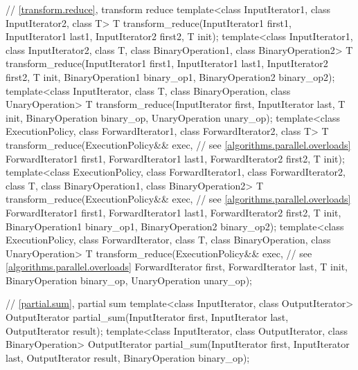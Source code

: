 \begin{codeblock}
{  // \ref{transform.reduce}, transform reduce
  template<class InputIterator1, class InputIterator2, class T>
    T transform_reduce(InputIterator1 first1, InputIterator1 last1,
                       InputIterator2 first2,
                       T init);
  template<class InputIterator1, class InputIterator2, class T,
           class BinaryOperation1, class BinaryOperation2>
    T transform_reduce(InputIterator1 first1, InputIterator1 last1,
                       InputIterator2 first2,
                       T init,
                       BinaryOperation1 binary_op1,
                       BinaryOperation2 binary_op2);
  template<class InputIterator, class T,
           class BinaryOperation, class UnaryOperation>
    T transform_reduce(InputIterator first, InputIterator last,
                       T init,
                       BinaryOperation binary_op, UnaryOperation unary_op);
  template<class ExecutionPolicy,
           class ForwardIterator1, class ForwardIterator2, class T>
    T transform_reduce(ExecutionPolicy&& exec, // see \ref{algorithms.parallel.overloads}
                       ForwardIterator1 first1, ForwardIterator1 last1,
                       ForwardIterator2 first2,
                       T init);
  template<class ExecutionPolicy,
           class ForwardIterator1, class ForwardIterator2, class T,
           class BinaryOperation1, class BinaryOperation2>
    T transform_reduce(ExecutionPolicy&& exec, // see \ref{algorithms.parallel.overloads}
                       ForwardIterator1 first1, ForwardIterator1 last1,
                       ForwardIterator2 first2,
                       T init,
                       BinaryOperation1 binary_op1,
                       BinaryOperation2 binary_op2);
  template<class ExecutionPolicy,
           class ForwardIterator, class T,
           class BinaryOperation, class UnaryOperation>
    T transform_reduce(ExecutionPolicy&& exec, // see \ref{algorithms.parallel.overloads}
                       ForwardIterator first, ForwardIterator last,
                       T init,
                       BinaryOperation binary_op, UnaryOperation unary_op);

  // \ref{partial.sum}, partial sum
  template<class InputIterator, class OutputIterator>
    OutputIterator partial_sum(InputIterator first,
                               InputIterator last,
                               OutputIterator result);
  template<class InputIterator, class OutputIterator, class BinaryOperation>
    OutputIterator partial_sum(InputIterator first,
                               InputIterator last,
                               OutputIterator result,
                               BinaryOperation binary_op);

}
\end{codeblock}
